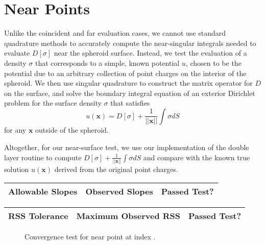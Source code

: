 \documentclass[12pt]{article}
\begin{document}
\section*{Near Points}
Unlike the coincident and far evaluation cases, we cannot use standard quadrature methods to accurately compute the near-singular integrals needed to evaluate $D[\sigma]$ near the spheroid surface.
Instead, we test the evaluation of a density $\sigma$ that corresponds to a simple, known potential $u$, chosen to be the potential due to an arbitrary collection of point charges on the interior of the spheroid.
We then use singular quadrature to construct the matrix operator for $D$ on the surface, and solve the boundary integral equation of an exterior Dirichlet problem for the surface density $\sigma$ that satisfies
$$u(\mathbf{x}) = D[\sigma] + \frac{1}{||\mathbf{x}||}\int \sigma d S$$
for any $\mathbf{x}$ outside of the spheroid. 

Altogether, for our near-surface test, we use our implementation of the double layer routine to compute $D[\sigma]+\frac{1}{||\mathbf{x}||}\int \sigma d S$ and compare with the known true solution $u(\mathbf{x})$ derived from the original point charges.

\begin{center}
\def\arraystretch{1.5}
\begin{tabular}{|c|c|c|}
    \hline
    Allowable Slopes & Observed Slopes & Passed Test?\\
    \hline
    
    \hline
\end{tabular}
\end{center}

\begin{center}
\def\arraystretch{1.5}
\begin{tabular}{|c|c|c|}
    \hline
    RSS Tolerance & Maximum Observed RSS & Passed Test?\\
    \hline
    
    \hline
\end{tabular}
\end{center}

\begin{figure}[!ht]
    \centering
    \caption{Convergence test for near point at index \protect.}
\end{figure}
\end{document}
